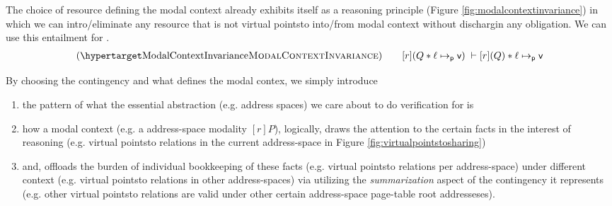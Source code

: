 The choice of resource defining the modal context already exhibits itself as a reasoning principle (Figure \ref{fig:modalcontextinvariance}) in which we can intro/eliminate any resource that is not virtual pointsto into/from modal context without dischargin any obligation. We can use this entailment for  .
  \[
  \begin{array}{l}
\hbox{(\TirNameStyle{ModalContextInvariance})} \qquad
 [r](Q \ast \ell \mapsto_{\textsf{p}} \vpage)  \;\vdash [r](Q) \ast \ell \mapsto_{\textsf{p}} \vpage 
  \end{array}
  \]
\begin{remark}
  \label{remark:pattern}
  By choosing the contingency and what defines the modal contex, we simply introduce 
  \begin{enumerate}
  \item the pattern of what the essential abstraction (e.g. address spaces) we care about to do verification for is
  \item how a modal context (e.g. a address-space modality $[r]P$), logically, draws the attention to the certain facts in the interest of reasoning (e.g. virtual pointsto relations in the current address-space in Figure \ref{fig:virtualpointstosharing})
  \item and, offloads the burden of individual bookkeeping of these facts (e.g. virtual pointsto relations per address-space) under different context (e.g. virtual pointsto relations in other address-spaces) via utilizing the \textit{summarization} aspect of the contingency it represents (e.g. other virtual pointsto relations are valid under other certain address-space page-table root addresseses).  
  \end{enumerate}
\end{remark}

